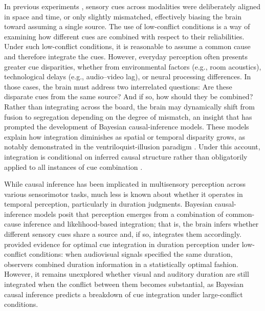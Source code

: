 \documentclass[9pt,lineno,doublespacing]{elife}
\begin{document}
In previous experiments \citep{shams2005sound,hartcher2014duration}, sensory cues across modalities were deliberately aligned in space and time, or only slightly mismatched, effectively biasing the brain toward assuming a single source. The use of low-conflict conditions is a way of examining how different cues are combined with respect to their reliabilities. Under such low-conflict conditions, it is reasonable to assume a common cause and therefore integrate the cues. However, everyday perception often presents greater cue disparities, whether from environmental factors (e.g., room acoustics), technological delays (e.g., audio–video lag), or neural processing differences. In those cases, the brain must address two interrelated questions: Are these disparate cues from the same source? And if so, how should they be combined? Rather than integrating across the board, the brain may dynamically shift from fusion to segregation depending on the degree of mismatch, an insight that has prompted the development of Bayesian causal-inference models. These models explain how integration diminishes as spatial or temporal disparity grows, as notably demonstrated in the ventriloquist-illusion paradigm \citep{shams2005sound,kording2007causal,hong2021causal}. Under this account, integration is conditional on inferred causal structure rather than obligatorily applied to all instances of cue combination \citep{kording2007causal,badde2018vision, badde2021causal,hong2021causal, badde2023multisensory, li2024uncertainty, li2025precision}. 


While causal inference has been implicated in multisensory perception across various sensorimotor tasks, much less is known about whether it operates in temporal perception, particularly in duration judgments.  Bayesian causal-inference models posit that perception emerges from a combination of common-cause inference and likelihood-based integration; that is, the brain infers whether different sensory cues share a source and, if so, integrates them accordingly. \cite{hartcher2014duration} provided evidence for optimal cue integration in duration perception under low-conflict conditions: when audiovisual signals specified the same duration, observers combined duration information in a statistically optimal fashion. However, it remains unexplored whether visual and auditory duration are still integrated when the conflict between them becomes substantial, as Bayesian causal inference predicts a breakdown of cue integration under large-conflict conditions. 
\end{document}
